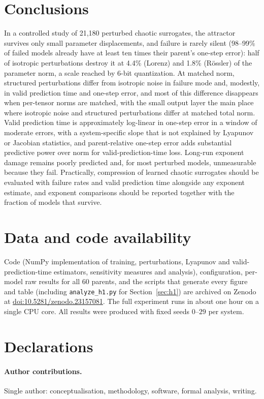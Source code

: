 \documentclass[11pt]{article}
\begin{document}
\section{Conclusions}
In a controlled study of 21{,}180 perturbed chaotic surrogates, the attractor survives only small parameter displacements, and failure is rarely silent (98--99\% of failed models already have at least ten times their parent's one-step error): half of isotropic perturbations destroy it at 4.4\% (Lorenz) and 1.8\% (R\"ossler) of the parameter norm, a scale reached by 6-bit quantization. At matched norm, structured perturbations differ from isotropic noise in failure mode and, modestly, in valid prediction time and one-step error, and most of this difference disappears when per-tensor norms are matched, with the small output layer the main place where isotropic noise and structured perturbations differ at matched total norm. Valid prediction time is approximately log-linear in one-step error in a window of moderate errors, with a system-specific slope that is not explained by Lyapunov or Jacobian statistics, and parent-relative one-step error adds substantial predictive power over norm for valid-prediction-time loss. Long-run exponent damage remains poorly predicted and, for most perturbed models, unmeasurable because they fail. Practically, compression of learned chaotic surrogates should be evaluated with failure rates and valid prediction time alongside any exponent estimate, and exponent comparisons should be reported together with the fraction of models that survive.

\section*{Data and code availability}
Code (NumPy implementation of training, perturbations, Lyapunov and valid-prediction-time estimators, sensitivity measures and analysis), configuration, per-model raw results for all 60 parents, and the scripts that generate every figure and table (including \texttt{analyze\_h1.py} for Section~\ref{sec:h1}) are archived on Zenodo at \href{https://doi.org/10.5281/zenodo.23157081}{doi:10.5281/zenodo.23157081}. The full experiment runs in about one hour on a single CPU core. All results were produced with fixed seeds $0$--$29$ per system.

\section*{Declarations}
\paragraph{Author contributions.} Single author: conceptualisation, methodology, software, formal analysis, writing.
\end{document}
